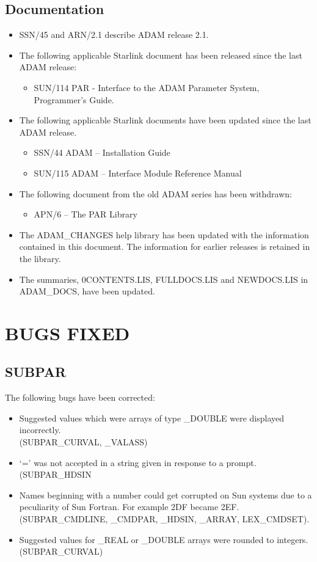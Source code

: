 \subsection{Documentation}
\label{docs}
\begin{itemize}
\item SSN/45 and ARN/2.1 describe ADAM release 2.1.
\item The following applicable Starlink document has been released since
 the last ADAM release:
\begin{itemize}
\item SUN/114 PAR - Interface to the ADAM Parameter System, Programmer's Guide.
\end{itemize}
\item The following applicable Starlink documents have been updated since the
last ADAM release.
\begin{itemize}
\item SSN/44 ADAM -- Installation Guide
\item SUN/115 ADAM -- Interface Module Reference Manual
\end{itemize}
\item The following document from the old ADAM series has been withdrawn:
\begin{itemize}
\item APN/6 -- The PAR Library
\end{itemize}
\item The ADAM\_CHANGES help library has been updated 
with the information contained in this document. The information for earlier
releases is
retained in the library.
\item The summaries, 0CONTENTS.LIS, FULLDOCS.LIS and NEWDOCS.LIS in
ADAM\-\_DOCS, have been updated. 
\end{itemize}

\section{BUGS FIXED}

\subsection{SUBPAR}
The following bugs have been corrected:
\begin{itemize}
\item Suggested values which were arrays of type \_DOUBLE were displayed 
incorrectly.\\
(SUBPAR\_CURVAL, \_VALASS)
\item `=' was not accepted in a string given in response to a prompt.\\
(SUBPAR\_HDSIN
\item Names beginning with a number could get corrupted on Sun systems due to
a peculiarity of Sun Fortran.
For example 2DF became 2EF.
(SUBPAR\_CMDLINE, \_CMDPAR, \_HDSIN, \_ARRAY, LEX\_CMDSET).
\item Suggested values for \_REAL or \_DOUBLE arrays were rounded to integers.\\
(SUBPAR\_CURVAL)
\end{itemize}

